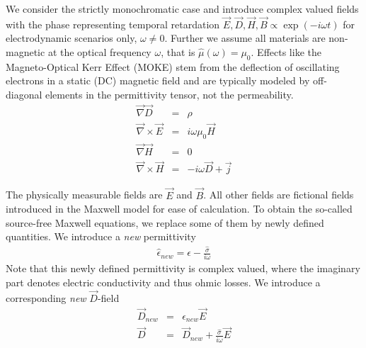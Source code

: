 \documentclass[12pt,a4paper,twoside,openright,BCOR10mm,headsepline,titlepage,abstracton,chapterprefix,final]{scrreprt}
\newcommand\vacuum{0}
\newcommand\Vector[1]{\vec{#1}}
\newcommand\Nabla{\Vector{\nabla}}
\newcommand\Tensor[1]{\hat{#1}}
\newcommand\scalarEfield{E}
\newcommand\scalarBfield{B}
\newcommand\scalarHfield{H}
\newcommand\scalarDfield{D}
\newcommand\Efield{\Vector{\scalarEfield}}
\newcommand\Bfield{\Vector{\scalarBfield}}
\newcommand\Hfield{\Vector{\scalarHfield}}
\newcommand\Dfield{\Vector{\scalarDfield}}
\newcommand\permeability{\Tensor{\mu}}
\newcommand\vacuumpermeability{\mu_{\vacuum}}
\newcommand\permittivity{\Tensor{\epsilon}}
\newcommand\conductivity{\Tensor{\sigma}}
\newcommand\currentdensity{\Vector{j}}
\newcommand\chargedensity{\rho}
\begin{document}
We consider the strictly monochromatic case and introduce complex valued fields with the phase representing temporal retardation $\Efield,\Dfield,\Hfield,\Bfield \propto \exp(-i \omega t)$ for electrodynamic scenarios only, $\omega \neq 0$. 
Further we assume all materials are non-magnetic at the optical frequency $\omega$, that is $\permeability(\omega) = \vacuumpermeability$. 
Effects like the Magneto-Optical Kerr Effect (MOKE) stem from the deflection of oscillating electrons in a static (DC) magnetic field and are typically modeled by off-diagonal elements in the permittivity tensor, not the permeability.
\begin{subequations}
\begin{eqnarray}
  \Nabla \Dfield &=& \chargedensity 					\\
  \Nabla \times \Efield &=& i \omega \vacuumpermeability \Hfield	\\
  \Nabla \Hfield &=& 0  					\\
  \Nabla \times \Hfield &=& - i \omega \Dfield + \currentdensity  		
\end{eqnarray}
\end{subequations}

The physically measurable fields are $\Efield$ and $\Bfield$. All other fields are fictional fields introduced in the Maxwell model for ease of calculation.
To obtain the so-called source-free Maxwell equations, we replace some of them by newly defined quantities.
We introduce a \emph{new} permittivity
\begin{eqnarray}
  \permittivity_{new} = \permittivity - \frac{\conductivity}{i \omega}
\end{eqnarray}
Note that this newly defined permittivity is complex valued, where the imaginary part denotes electric conductivity and thus ohmic losses.
We introduce a corresponding \emph{new} $\Dfield$-field
\begin{eqnarray}
  \Dfield_{new} &=& \permittivity_{new} \Efield \\
  \Dfield &=& \Dfield_{new} + \frac{\conductivity}{i \omega} \Efield
\end{eqnarray}
\end{document}
